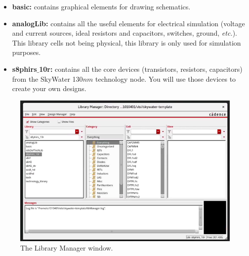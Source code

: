 \begin{enumerate}
	\begin{itemize}
		\item \textbf{basic:} contains graphical elements for drawing schematics.
		\item \textbf{analogLib:} contains all the useful elements for electrical simulation (voltage and current sources, ideal resistors and capacitors, switches, ground, \textit{etc.}). This library cells not being physical, this library is only used for simulation purposes.
		\item \textbf{s8phirs$\_$10r:} contains all the core devices (transistors, resistors, capacitors) from the SkyWater 130$nm$ technology node. You will use those devices to create your own designs.
	\end{itemize}	
	\begin{figure}[!h]
		\centering
		\includegraphics[scale=0.21]{figures/lab1_schematic_sim/library}
		\caption{The Library Manager window.}
		\label{fig_library}
	\end{figure}
	

\end{enumerate}
